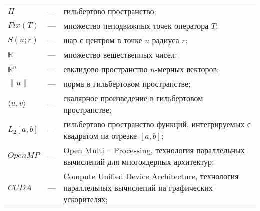 
\begin{longtable}{lp{}p{}}
	
$H$ & --- & гильбертово пространство;\\

$Fix(T)$ & --- & множество неподвижных точек оператора $T$;\\

$S(u; r)$ & --- & шар с центром в точке $u$ радиуса $r$;\\

$\mathbb{R}$ & --- & множество вещественных чисел;\\

$\mathbb{R}^n$ & --- & евклидово пространство $n$-мерных векторов; \\

$\|u\|$ & --- & норма в гильбертовом пространстве;\\

$\langle u, v\rangle$ & --- & скалярное произведение в гильбертовом пространстве;\\

$L_2[a, b]$ & --- & гильбертово пространство функций, интегрируемых с квадратом на отрезке $[a, b]$;\\

$OpenMP$ & --- & Open Multi -- Processing, технология параллельных вычислений для многоядерных архитектур;\\

$CUDA$ & --- & Compute Unified Device Architecture, технология параллельных вычислений на графических ускорителях;\\

\end{longtable}
